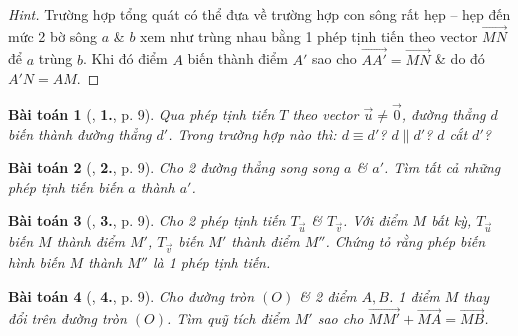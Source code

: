 \documentclass{article}
\numberwithin{equation}{section}
\newtheorem{baitoan}{Bài toán}[section]
\begin{document}
\begin{proof}[Hint]
	Trường hợp tổng quát có thể đưa về trường hợp con sông rất hẹp -- hẹp đến mức 2 bờ sông $a$ \& $b$ xem như trùng nhau bằng 1 phép tịnh tiến theo vector $\overrightarrow{MN}$ để $a$ trùng $b$. Khi đó điểm $A$ biến thành điểm $A'$ sao cho $\overrightarrow{AA'} = \overrightarrow{MN}$ \& do đó $A'N = AM$.
\end{proof}

\begin{baitoan}[\cite{SGK_Toan_11_hinh_hoc_nang_cao}, \textbf{1.}, p. 9]
	Qua phép tịnh tiến $T$ theo vector $\vec{u}\ne\vec{0}$, đường thẳng $d$ biến thành đường thẳng $d'$. Trong trường hợp nào thì: $d\equiv d'$? $d\parallel d'$? $d$ cắt $d'$? 
\end{baitoan}

\begin{baitoan}[\cite{SGK_Toan_11_hinh_hoc_nang_cao}, \textbf{2.}, p. 9]
	Cho 2 đường thẳng song song $a$ \& $a'$. Tìm tất cả những phép tịnh tiến biến $a$ thành $a'$.
\end{baitoan}

\begin{baitoan}[\cite{SGK_Toan_11_hinh_hoc_nang_cao}, \textbf{3.}, p. 9]
	Cho 2 phép tịnh tiến $T_{\vec{u}}$ \& $T_{\vec{v}}$. Với điểm $M$ bất kỳ, $T_{\vec{u}}$ biến $M$ thành điểm $M'$, $T_{\vec{v}}$ biến $M'$ thành điểm $M''$. Chứng tỏ rằng phép biến hình biến $M$ thành $M''$ là 1 phép tịnh tiến.
\end{baitoan}

\begin{baitoan}[\cite{SGK_Toan_11_hinh_hoc_nang_cao}, \textbf{4.}, p. 9]
	Cho đường tròn $(O)$ \& 2 điểm $A,B$. 1 điểm $M$ thay đổi trên đường tròn $(O)$. Tìm quỹ tích điểm $M'$ sao cho $\overrightarrow{MM'} + \overrightarrow{MA} = \overrightarrow{MB}$.
\end{baitoan}
\end{document}
